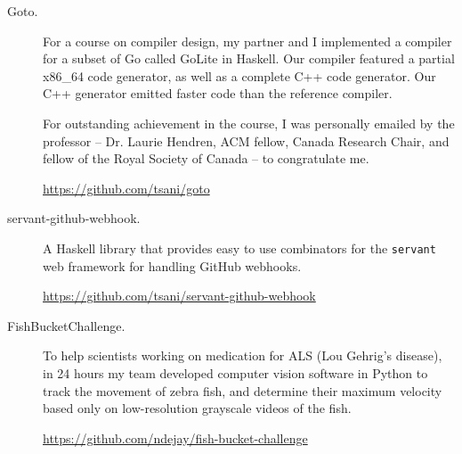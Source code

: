\documentclass{article}
\begin{document}
\begin{description}
  \item[Goto.]
     For a course on compiler design, my partner and I implemented a compiler
     for a subset of Go called GoLite in Haskell. Our compiler featured a
     partial x86\_64 code generator, as well as a complete C++ code generator.
     Our C++ generator emitted faster code than the reference compiler.

     For outstanding achievement in the course, I was personally emailed by the
     professor -- Dr. Laurie Hendren, ACM fellow, Canada Research Chair, and
     fellow of the Royal Society of Canada -- to congratulate me.

     \url{https://github.com/tsani/goto}

  \item[servant-github-webhook.] A Haskell library that provides easy to
    use combinators for the \texttt{servant} web framework for handling
    GitHub webhooks.

    \url{https://github.com/tsani/servant-github-webhook}



  \item[FishBucketChallenge.]
    To help scientists working on medication for ALS (Lou Gehrig's disease), in
    24 hours my team developed computer vision software in Python to track the
    movement of zebra fish, and determine their maximum velocity based only on
    low-resolution grayscale videos of the fish.

    \url{https://github.com/ndejay/fish-bucket-challenge}





\end{description}
\end{document}
